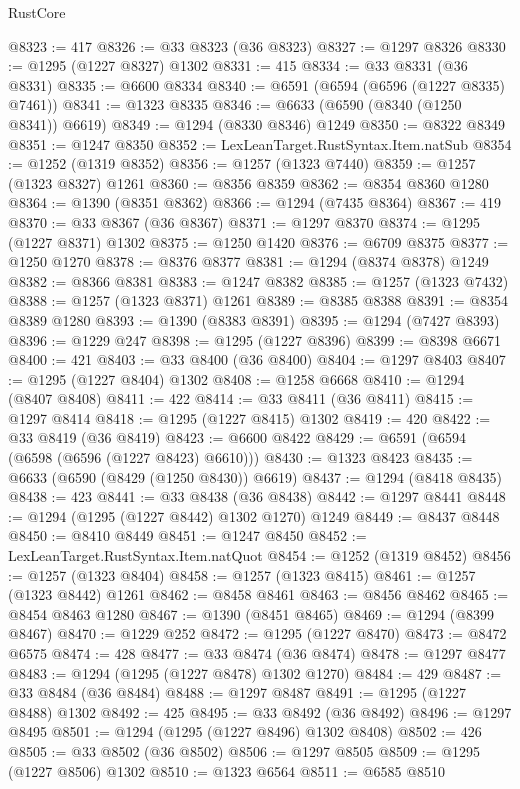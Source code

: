\begin{lexlean}{RustCore}
\begin{coremodule}
@8323 := 417
@8326 := @33 @8323 (@36 @8323)
@8327 := @1297 @8326
@8330 := @1295 (@1227 @8327) @1302
@8331 := 415
@8334 := @33 @8331 (@36 @8331)
@8335 := @6600 @8334
@8340 := @6591 (@6594 (@6596 (@1227 @8335) @7461))
@8341 := @1323 @8335
@8346 := @6633 (@6590 (@8340 (@1250 @8341)) @6619)
@8349 := @1294 (@8330 @8346) @1249
@8350 := @8322 @8349
@8351 := @1247 @8350
@8352 := LexLeanTarget.RustSyntax.Item.natSub
@8354 := @1252 (@1319 @8352)
@8356 := @1257 (@1323 @7440)
@8359 := @1257 (@1323 @8327) @1261
@8360 := @8356 @8359
@8362 := @8354 @8360 @1280
@8364 := @1390 (@8351 @8362)
@8366 := @1294 (@7435 @8364)
@8367 := 419
@8370 := @33 @8367 (@36 @8367)
@8371 := @1297 @8370
@8374 := @1295 (@1227 @8371) @1302
@8375 := @1250 @1420
@8376 := @6709 @8375
@8377 := @1250 @1270
@8378 := @8376 @8377
@8381 := @1294 (@8374 @8378) @1249
@8382 := @8366 @8381
@8383 := @1247 @8382
@8385 := @1257 (@1323 @7432)
@8388 := @1257 (@1323 @8371) @1261
@8389 := @8385 @8388
@8391 := @8354 @8389 @1280
@8393 := @1390 (@8383 @8391)
@8395 := @1294 (@7427 @8393)
@8396 := @1229 @247
@8398 := @1295 (@1227 @8396)
@8399 := @8398 @6671
@8400 := 421
@8403 := @33 @8400 (@36 @8400)
@8404 := @1297 @8403
@8407 := @1295 (@1227 @8404) @1302
@8408 := @1258 @6668
@8410 := @1294 (@8407 @8408)
@8411 := 422
@8414 := @33 @8411 (@36 @8411)
@8415 := @1297 @8414
@8418 := @1295 (@1227 @8415) @1302
@8419 := 420
@8422 := @33 @8419 (@36 @8419)
@8423 := @6600 @8422
@8429 := @6591 (@6594 (@6598 (@6596 (@1227 @8423) @6610)))
@8430 := @1323 @8423
@8435 := @6633 (@6590 (@8429 (@1250 @8430)) @6619)
@8437 := @1294 (@8418 @8435)
@8438 := 423
@8441 := @33 @8438 (@36 @8438)
@8442 := @1297 @8441
@8448 := @1294 (@1295 (@1227 @8442) @1302 @1270) @1249
@8449 := @8437 @8448
@8450 := @8410 @8449
@8451 := @1247 @8450
@8452 := LexLeanTarget.RustSyntax.Item.natQuot
@8454 := @1252 (@1319 @8452)
@8456 := @1257 (@1323 @8404)
@8458 := @1257 (@1323 @8415)
@8461 := @1257 (@1323 @8442) @1261
@8462 := @8458 @8461
@8463 := @8456 @8462
@8465 := @8454 @8463 @1280
@8467 := @1390 (@8451 @8465)
@8469 := @1294 (@8399 @8467)
@8470 := @1229 @252
@8472 := @1295 (@1227 @8470)
@8473 := @8472 @6575
@8474 := 428
@8477 := @33 @8474 (@36 @8474)
@8478 := @1297 @8477
@8483 := @1294 (@1295 (@1227 @8478) @1302 @1270)
@8484 := 429
@8487 := @33 @8484 (@36 @8484)
@8488 := @1297 @8487
@8491 := @1295 (@1227 @8488) @1302
@8492 := 425
@8495 := @33 @8492 (@36 @8492)
@8496 := @1297 @8495
@8501 := @1294 (@1295 (@1227 @8496) @1302 @8408)
@8502 := 426
@8505 := @33 @8502 (@36 @8502)
@8506 := @1297 @8505
@8509 := @1295 (@1227 @8506) @1302
@8510 := @1323 @6564
@8511 := @6585 @8510

\end{coremodule}
\end{lexlean}
